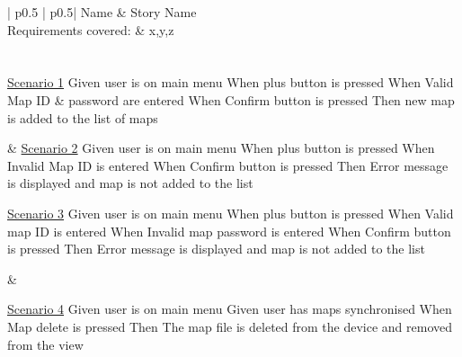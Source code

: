 \begin{longtable}{| p{} | p{}|}
	\hline
	Name & Story Name\\\hline
	Requirements covered: & x,y,z\\\hline
	\\\hline
	\\\hline
	\newline\underline{Scenario 1}\newline
	Given user is on main menu \newline
	When plus button is pressed \newline 
	When Valid Map ID \& password are entered \newline 
	When Confirm button is pressed \newline 
	Then new map is added to the list of maps\newline
	
	& 
	\underline{Scenario 2}\newline
	Given user is on main menu \newline
	When plus button is pressed \newline 
	When Invalid Map ID is entered \newline 
	When Confirm button is pressed \newline 
	Then Error message is displayed and map is not added to the list\newline\\\hline
	
	\underline{Scenario 3}\newline
	Given user is on main menu \newline
	When plus button is pressed \newline 
	When Valid map ID is entered \newline 
	When Invalid map password is entered \newline 
	When Confirm button is pressed \newline 
	Then Error message is displayed and map is not added to the list\newline
	
	&
	
	\underline{Scenario 4}\newline
	Given user is on main menu \newline
	Given user has maps synchronised \newline
	When Map delete is pressed \newline 
	Then The map file is deleted from the device and removed from the view\newline\\\hline
	

\end{longtable}
